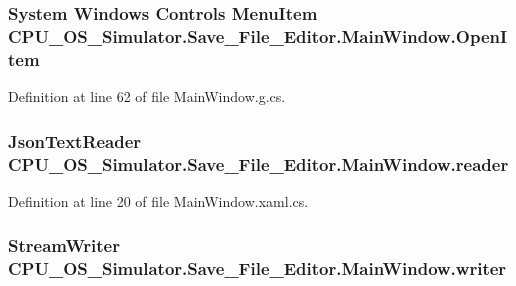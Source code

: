 \subsubsection[{Open\+Item}]{\setlength{\rightskip}{0pt plus 5cm}System Windows Controls Menu\+Item C\+P\+U\+\_\+\+O\+S\+\_\+\+Simulator.\+Save\+\_\+\+File\+\_\+\+Editor.\+Main\+Window.\+Open\+Item\hspace{0.3cm}{\ttfamily [package]}}\label{class_c_p_u___o_s___simulator_1_1_save___file___editor_1_1_main_window_aebf8cad0b5c0d104ce4c458034e3422f}


Definition at line 62 of file Main\+Window.\+g.\+cs.

\hypertarget{class_c_p_u___o_s___simulator_1_1_save___file___editor_1_1_main_window_a1656475bf9628e4335781cf30a84d93e}{}
\subsubsection[{reader}]{\setlength{\rightskip}{0pt plus 5cm}Json\+Text\+Reader C\+P\+U\+\_\+\+O\+S\+\_\+\+Simulator.\+Save\+\_\+\+File\+\_\+\+Editor.\+Main\+Window.\+reader\hspace{0.3cm}{\ttfamily [private]}}\label{class_c_p_u___o_s___simulator_1_1_save___file___editor_1_1_main_window_a1656475bf9628e4335781cf30a84d93e}


Definition at line 20 of file Main\+Window.\+xaml.\+cs.

\hypertarget{class_c_p_u___o_s___simulator_1_1_save___file___editor_1_1_main_window_afe228202821ede30538aebda6142f8da}{}
\subsubsection[{writer}]{\setlength{\rightskip}{0pt plus 5cm}Stream\+Writer C\+P\+U\+\_\+\+O\+S\+\_\+\+Simulator.\+Save\+\_\+\+File\+\_\+\+Editor.\+Main\+Window.\+writer\hspace{0.3cm}{\ttfamily [private]}}\label{class_c_p_u___o_s___simulator_1_1_save___file___editor_1_1_main_window_afe228202821ede30538aebda6142f8da}


